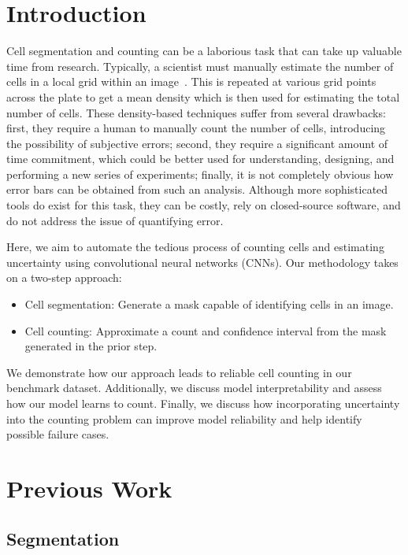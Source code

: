 \documentclass[10pt,twocolumn,letterpaper]{article}
\begin{document}
\section{Introduction}
Cell segmentation and counting can be a laborious task that can take up valuable time from research.
Typically, a scientist must manually estimate the number of cells in a local grid within an image~\cite{Abcam}.
This is repeated at various grid points across the plate to get a mean density which is then used for estimating the
total number of cells. These density-based techniques suffer from several drawbacks: first, they require a human
to manually count the number of cells, introducing the possibility of subjective errors;
second, they require a significant amount of time commitment, which could be better used for understanding, designing,
and performing a new series of experiments; finally, it is not completely obvious how error bars can be obtained from such
an analysis. Although more sophisticated tools do exist for this task, they can be costly, rely on closed-source software,
and do not address the issue of quantifying error.

Here, we aim to automate the tedious process of counting cells and estimating uncertainty using convolutional neural networks (CNNs).
Our methodology takes on a two-step approach:

\begin{itemize}\itemsep=2pt
\item Cell segmentation: Generate a mask capable of identifying cells in an image. 
\item Cell counting: Approximate a count and confidence interval from the mask generated in the prior step.
\end{itemize}

We demonstrate how our approach leads to reliable cell counting in our benchmark dataset.
Additionally, we discuss model interpretability and assess how our model learns to count.
Finally, we discuss how incorporating uncertainty into the counting problem can improve model
reliability and help identify possible failure cases.

\section{Previous Work}

\subsection{Segmentation}
\end{document}
